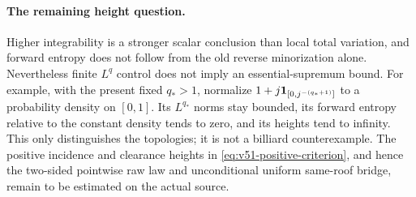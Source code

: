\paragraph{The remaining height question.}
Higher integrability is a stronger scalar conclusion than local total
variation, and forward entropy does not follow from the old reverse
minorization alone. Nevertheless finite $L^q$ control does not imply
an essential-supremum bound. For example, with the present fixed $q_*>1$,
normalize $1+j\mathbf1_{[0,j^{-(q_*+1)}]}$ to a probability density on
$[0,1]$. Its $L^{q_*}$ norms stay bounded, its forward entropy relative
to the constant density tends to zero, and its heights tend to
infinity. This only distinguishes the topologies; it is not a billiard
counterexample. The positive incidence and clearance heights in
\eqref{eq:v51-positive-criterion}, and hence the two-sided pointwise
raw law and unconditional uniform same-roof bridge, remain to be
estimated on the actual source.
